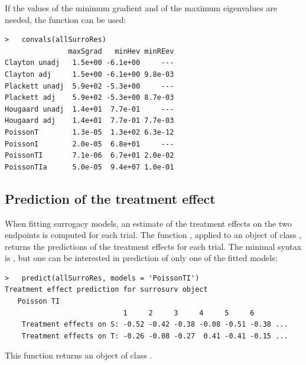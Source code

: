 \documentclass[]{scrartcl}\usepackage[]{graphicx}\usepackage[]{color}
\begin{document}
{{If the values of the minimum gradient and of the maximum eigenvalues are needed,
  the function  can be used:
\begin{lstlisting}
>   convals(allSurroRes)
               maxSgrad   minHev minREev
Clayton unadj   1.5e+00 -6.1e+00     ---
Clayton adj     1.5e+00 -6.1e+00 9.8e-03
Plackett unadj  5.9e+02 -5.3e+00     ---
Plackett adj    5.9e+02 -5.3e+00 8.7e-03
Hougaard unadj  1.4e+01  7.7e-01     ---
Hougaard adj    1.4e+01  7.7e-01 7.7e-03
PoissonT        1.3e-05  1.3e+02 6.3e-12
PoissonI        2.0e-05  6.8e+01     ---
PoissonTI       7.1e-06  6.7e+01 2.0e-02
PoissonTIa      5.0e-05  9.4e+07 1.0e-01
\end{lstlisting}


\subsection{Prediction of the treatment effect}
When fitting surrogacy models,
  an estimate of the treatment effects on the two endpoints
  is computed for each trial.
The function , applied to an object of class ,
  returns the predictions of the treatment effects for each trial.
The minimal syntax is ,
  but one can be interested in prediction of only one of the fitted models:
\begin{lstlisting}
>   predict(allSurroRes, models = 'PoissonTI')
Treatment effect prediction for surrosurv object
   Poisson TI 
                            1     2     3     4     5     6        
    Treatment effects on S: -0.52 -0.42 -0.38 -0.08 -0.51 -0.38 ...
    Treatment effects on T: -0.26 -0.08 -0.27  0.41 -0.41 -0.15 ...
\end{lstlisting}
This function returns an object of class .

}}
\end{document}
